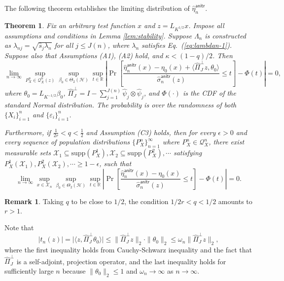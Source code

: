\documentclass[aos]{imsart}
\renewcommand{\hat}{\widehat}
\newcommand{\supp}{\mathrm{supp}}
\newcommand{\mX}{\mathcal X}
\newcommand{\mH}{\mathcal H}
\newcommand{\anitr}{\mathsf{anitr}}
\theoremstyle{plain}
\newtheorem{theorem}{Theorem}[section]
\theoremstyle{definition}
\theoremstyle{definition}
\newtheorem{remark}{Remark}[section]
\begin{document}
The following theorem establishes the limiting distribution of $\hat\eta_n^\anitr$.
\begin{theorem}
Fix an arbitrary test function $x$ and $z=L_{K^{1/2}}x$.
Impose all assumptions and conditions in Lemma \ref{lem:stability}. Suppose $\Lambda_n$ is constructed as $\lambda_{nj}=\sqrt{\hat s_j\lambda_n}$ for all $j\leq J(n)$,
where $\lambda_n$ satisfies Eq.~(\ref{eq:lambdan-1}). Suppose also that Assumptions (A1), (A2) hold, and $\kappa<(1-q)/2$. Then 
$$
\lim_{n\to\infty} \sup_{P_X^n\in\mathcal Q_X^n(z)}\sup_{\beta_0\in\Theta_2(\mH)}\sup_{t\in\mathbb R}\left|\Pr\left[\frac{\hat\eta_n^{\anitr}(x)-\eta_0(x)+\langle\hat\Pi_J^\perp z, \theta_0\rangle}{\hat\sigma_n^\anitr(z)}\leq t\right] - \Phi(t)\right| = 0,
$$
where $\theta_0=L_{K^{-1/2}}\beta_0$, $\hat\Pi_J^\perp = I - \sum_{j=1}^{J(n)}\hat\psi_j\otimes\hat\psi_j$, and $\Phi(\cdot)$ is the CDF of the standard Normal distribution.
The probability is over the randomness of both $\{X_i\}_{i=1}^n$ and $\{\varepsilon_i\}_{i=1}^n$. 

{\color{orange}
Furthermore, if $\frac{1}{2r}<q<\frac{1}{2}$ and Assumption (C3) holds, then for every $\epsilon>0$ and every sequence of population distributions $\{P_X^n\}_{n=1}^{\infty}$ where $P_X^n\in\mathcal Q_X^n$, there exist measurable sets $\mX_1\subseteq\supp(P_X^1),\mX_2\subseteq\supp(P_X^2),\cdots$ satisfying $P_X^1(\mX_1),P_X^2(\mX_2),\cdots\geq 1-\epsilon$,
such that
$$
\lim_{n\to\infty} \sup_{x\in\mX_n}\sup_{\beta_0\in\Theta_2(\mH)}\sup_{t\in\mathbb R}\left|\Pr\left[\frac{\hat\eta_n^{\anitr}(x)-\eta_0(x)}{\hat\sigma_n^\anitr(z)}\leq t\right] - \Phi(t)\right| = 0.
$$}
\label{thm:anitr-limiting}
\end{theorem}


\begin{remark}
Taking $q$ to be close to $1/2$, the condition $1/2r<q<1/2$ amounts to $r>1$.
\end{remark}

Note that 
\begin{equation}
\big|t_n(z)\big| = \big|\langle z, \hat\Pi_J^\perp\theta_0\rangle\big|\leq \|\hat\Pi_J^\perp z\|_2\cdot \|\theta_0\|_2 \leq \omega_n\|\hat\Pi_J^\perp z\|_2,
\label{eq:anitr-limiting-impl}
\end{equation}
where the first inequality holds from Cauchy-Schwarz inequality and the fact that $\hat\Pi_J^\perp$ is a self-adjoint, projection operator, and the 
last inequality holds for sufficiently large $n$ because $\|\theta_0\|_2\leq 1$ and $\omega_n\to\infty$ as $n\to\infty$.
\end{document}

